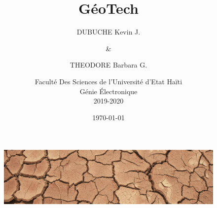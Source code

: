 \documentclass[a4paper,12pt]{report}
\begin{document}
\begin{figure}[t]
        \centering
        \includegraphics[width=1\textwidth]{image_fond}
        \label{image-GIS}
        \end{figure}

\title{\textbf{\huge{GéoTech}}}
\author{
        DUBUCHE Kevin J.

        \and
        \&
        \and
        THEODORE Barbara G.
        \and
        Faculté Des Sciences de l'Université d'Etat Haïti \\ 
         Génie Électronique \\
         2019-2020
}
\date{\today}

\maketitle

\tableofcontents
\newpage
{}























\end{document}
